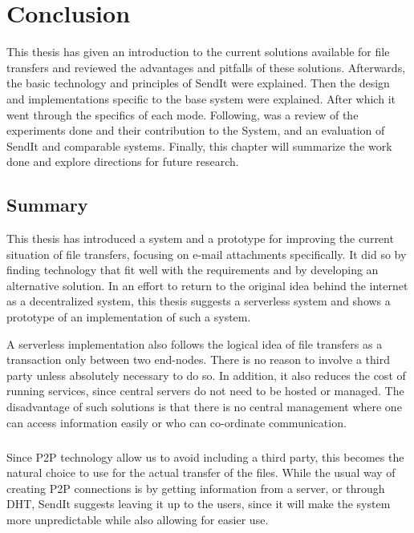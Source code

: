 %
\chapter{Conclusion} %
%
\label{Chapter6} %
%
This thesis has given an introduction to the current solutions available for file transfers and reviewed the advantages and pitfalls of these solutions. Afterwards, the basic technology and principles of SendIt were explained. Then the design and implementations specific to the base system were explained. After which it went through the specifics of each mode. Following, was a review of the experiments done and their contribution to the System, and an evaluation of SendIt and comparable systems. Finally, this chapter will summarize the work done and explore directions for future research.
%
\section{Summary}
%
This thesis has introduced a system and a prototype for improving the current situation of file transfers, focusing on e-mail attachments specifically. It did so by finding technology that fit well with the requirements and by developing an alternative solution. In an effort to return to the original idea behind the internet as a decentralized system, this thesis suggests a serverless system and shows a prototype of an implementation of such a system.

A serverless implementation also follows the logical idea of file transfers as a transaction only between two end-nodes. There is no reason to involve a third party unless absolutely necessary to do so. In addition, it also reduces the cost of running services, since central servers do not need to be hosted or managed. The disadvantage of such solutions is that there is no central management where one can access information easily or who can co-ordinate communication.
%
\paragraph{}
%
Since P2P technology allow us to avoid including a third party, this becomes the natural choice to use for the actual transfer of the files. While the usual way of creating P2P connections is by getting information from a server, or through DHT, SendIt suggests leaving it up to the users, since it will make the system more unpredictable while also allowing for easier use.

